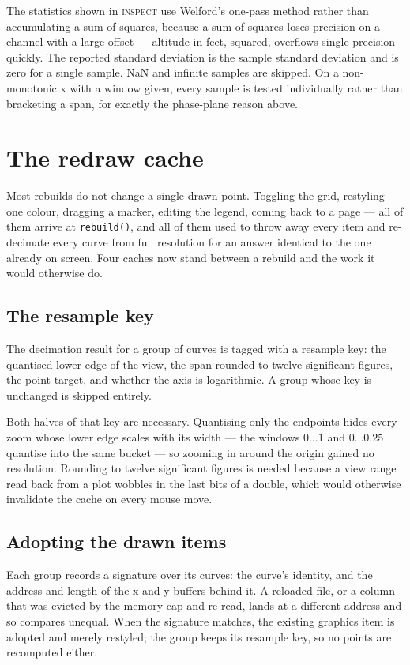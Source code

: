 \documentclass[11pt,a4paper,oneside]{report}
\newcommand{\code}[1]{\texttt{#1}}
\newcommand{\tab}[1]{\textsc{#1}}
\begin{document}
The statistics shown in \tab{inspect} use Welford's one-pass method rather than
accumulating a sum of squares, because a sum of squares loses precision on a
channel with a large offset --- altitude in feet, squared, overflows single
precision quickly. The reported standard deviation is the sample standard
deviation and is zero for a single sample. NaN and infinite samples are skipped.
On a non-monotonic x with a window given, every sample is tested individually
rather than bracketing a span, for exactly the phase-plane reason above.

\section{The redraw cache}
\label{sec:redrawcache}

Most rebuilds do not change a single drawn point. Toggling the grid, restyling
one colour, dragging a marker, editing the legend, coming back to a page --- all
of them arrive at \code{rebuild()}, and all of them used to throw away every
item and re-decimate every curve from full resolution for an answer identical to
the one already on screen. Four caches now stand between a rebuild and the work
it would otherwise do.

\subsection{The resample key}

The decimation result for a group of curves is tagged with a resample key: the
quantised lower edge of the view, the span rounded to twelve significant
figures, the point target, and whether the axis is logarithmic. A group whose
key is unchanged is skipped entirely.

Both halves of that key are necessary. Quantising only the endpoints hides every
zoom whose lower edge scales with its width --- the windows $0 \ldots 1$ and
$0 \ldots 0.25$ quantise into the same bucket --- so zooming in around the
origin gained no resolution. Rounding to twelve significant figures is needed
because a view range read back from a plot wobbles in the last bits of a double,
which would otherwise invalidate the cache on every mouse move.

\subsection{Adopting the drawn items}

Each group records a signature over its curves: the curve's identity, and the
address and length of the x and y buffers behind it. A reloaded file, or a
column that was evicted by the memory cap and re-read, lands at a different
address and so compares unequal. When the signature matches, the existing
graphics item is adopted and merely restyled; the group keeps its resample key,
so no points are recomputed either.
\end{document}
